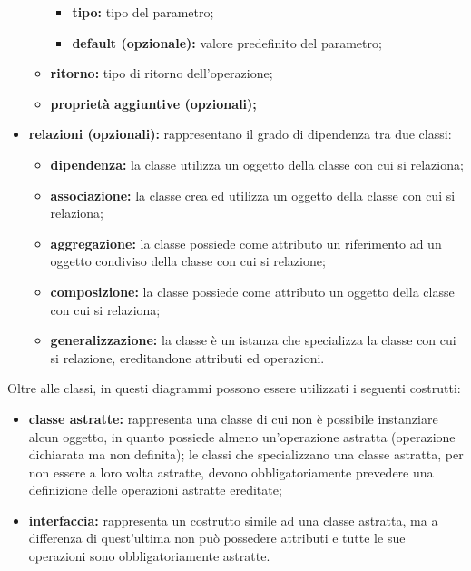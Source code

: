 \begin{itemize}[leftmargin=1.5cm]
\begin{itemize}
\begin{itemize}
									\item \textbf{tipo:} tipo del parametro;
									\item \textbf{default (opzionale):} valore predefinito del parametro;
								\end{itemize}
								\item \textbf{ritorno:} tipo di ritorno dell'operazione;
								\item \textbf{proprietà aggiuntive (opzionali);}
							\end{itemize}
							\item \textbf{relazioni (opzionali):} rappresentano il grado di dipendenza tra due classi:
							\begin{itemize}
								\item \textbf{dipendenza:} la classe utilizza un oggetto della classe con cui si relaziona;
								\item \textbf{associazione:} la classe crea ed utilizza un oggetto della classe con cui si relaziona;
								\item \textbf{aggregazione:} la classe possiede come attributo un riferimento ad un oggetto condiviso della classe con cui si relazione;
								\item \textbf{composizione:} la classe possiede come attributo un oggetto della classe con cui si relaziona;
								\item \textbf{generalizzazione:} la classe è un istanza che specializza la classe con cui si relazione, ereditandone attributi ed operazioni.
							\end{itemize}
						\end{itemize}

						\hangindent=0.6cm Oltre alle classi, in questi diagrammi possono essere utilizzati i seguenti costrutti:
						\begin{itemize}[leftmargin=1.5cm]
							\item \textbf{classe astratte:} rappresenta una classe di cui non è possibile instanziare alcun oggetto, in quanto possiede almeno un'operazione astratta (operazione dichiarata ma non definita); le classi che specializzano una classe astratta, per non essere a loro volta astratte, devono obbligatoriamente prevedere una definizione delle operazioni astratte ereditate;
							\item \textbf{interfaccia:} rappresenta un costrutto simile ad una classe astratta, ma a differenza di quest'ultima non può possedere attributi e tutte le sue operazioni sono obbligatoriamente astratte.
						\end{itemize}
						

